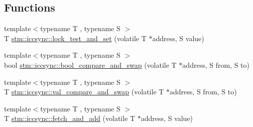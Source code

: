 \subsection*{Functions}
\begin{DoxyCompactItemize}
\item 
{\footnotesize template$<$typename T , typename S $>$ }\\T \hyperlink{namespacestm_1_1iccsync_a9b09f35a68551cff0b8cbbd3cc4424ef}{stm\-::iccsync\-::lock\-\_\-test\-\_\-and\-\_\-set} (volatile T $\ast$address, S value)
\item 
{\footnotesize template$<$typename T , typename S $>$ }\\bool \hyperlink{namespacestm_1_1iccsync_ae9b8fb58e501278819d7083a0b8802f0}{stm\-::iccsync\-::bool\-\_\-compare\-\_\-and\-\_\-swap} (volatile T $\ast$address, S from, S to)
\item 
{\footnotesize template$<$typename T , typename S $>$ }\\T \hyperlink{namespacestm_1_1iccsync_afa85ce51e68f13c37b0240e7bc662c31}{stm\-::iccsync\-::val\-\_\-compare\-\_\-and\-\_\-swap} (volatile T $\ast$address, S from, S to)
\item 
{\footnotesize template$<$typename T , typename S $>$ }\\T \hyperlink{namespacestm_1_1iccsync_ac92b0d2a99b157c716d8f842fe8233ed}{stm\-::iccsync\-::fetch\-\_\-and\-\_\-add} (volatile T $\ast$address, S value)
\end{DoxyCompactItemize}


